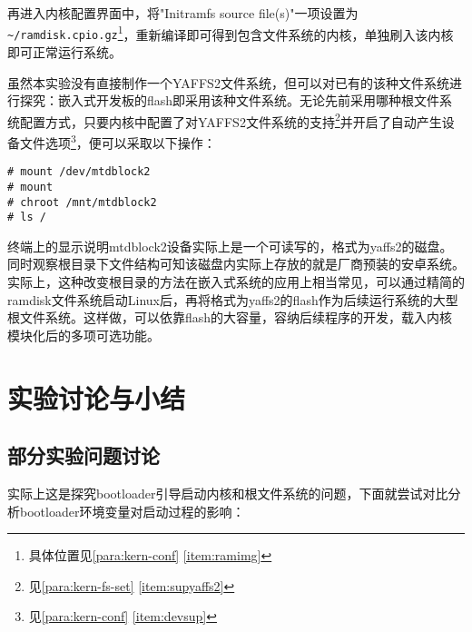 \documentclass[hyperref,UTF8]{ctexart}
\begin{document}
再进入内核配置界面中，将"Initramfs source file(s)"一项设置为{\verb"~/ramdisk.cpio.gz"}\footnote{具体位置见\ref{para:kern-conf} \ref{item:ramimg}}，重新编译即可得到包含文件系统的内核，单独刷入该内核即可正常运行系统。

虽然本实验没有直接制作一个YAFFS2文件系统，但可以对已有的该种文件系统进行探究：嵌入式开发板的flash即采用该种文件系统。无论先前采用哪种根文件系统配置方式，只要内核中配置了对YAFFS2文件系统的支持\footnote{见\ref{para:kern-fs-set} \ref{item:supyaffs2}}并开启了自动产生设备文件选项\footnote{见\ref{para:kern-conf} \ref{item:devsup}}，便可以采取以下操作：
\begin{Verbatim}[frame=single]
# mount /dev/mtdblock2
# mount
# chroot /mnt/mtdblock2
# ls /
\end{Verbatim}

终端上的显示说明mtdblock2设备实际上是一个可读写的，格式为yaffs2的磁盘。同时观察根目录下文件结构可知该磁盘内实际上存放的就是厂商预装的安卓系统。实际上，这种改变根目录的方法在嵌入式系统的应用上相当常见，可以通过精简的ramdisk文件系统启动Linux后，再将格式为yaffs2的flash作为后续运行系统的大型根文件系统。这样做，可以依靠flash的大容量，容纳后续程序的开发，载入内核模块化后的多项可选功能。

\section{实验讨论与小结}

\subsection{部分实验问题讨论}
{}

实际上这是探究bootloader引导启动内核和根文件系统的问题，下面就尝试对比分析bootloader环境变量对启动过程的影响：
\end{document}
